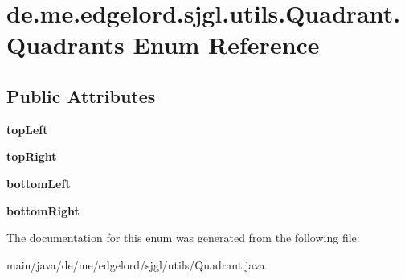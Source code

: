 \hypertarget{enumde_1_1me_1_1edgelord_1_1sjgl_1_1utils_1_1_quadrant_1_1_quadrants}{}\section{de.\+me.\+edgelord.\+sjgl.\+utils.\+Quadrant.\+Quadrants Enum Reference}
\label{enumde_1_1me_1_1edgelord_1_1sjgl_1_1utils_1_1_quadrant_1_1_quadrants}
\subsection*{Public Attributes}
\begin{DoxyCompactItemize}
\item 
\mbox{\label{enumde_1_1me_1_1edgelord_1_1sjgl_1_1utils_1_1_quadrant_1_1_quadrants_a668ad3845f3ac552160d4dabf21b4bf1}} 
{\bfseries top\+Left}
\item 
\mbox{\label{enumde_1_1me_1_1edgelord_1_1sjgl_1_1utils_1_1_quadrant_1_1_quadrants_abd1898b80055cb11c09436b2052ecc01}} 
{\bfseries top\+Right}
\item 
\mbox{\label{enumde_1_1me_1_1edgelord_1_1sjgl_1_1utils_1_1_quadrant_1_1_quadrants_ac5ec8a5fb7430802d201c2de2369f0c3}} 
{\bfseries bottom\+Left}
\item 
\mbox{\label{enumde_1_1me_1_1edgelord_1_1sjgl_1_1utils_1_1_quadrant_1_1_quadrants_aead464df2f8814de4dbf0b076f37f791}} 
{\bfseries bottom\+Right}
\end{DoxyCompactItemize}


The documentation for this enum was generated from the following file\+:\begin{DoxyCompactItemize}
\item 
main/java/de/me/edgelord/sjgl/utils/Quadrant.\+java\end{DoxyCompactItemize}
